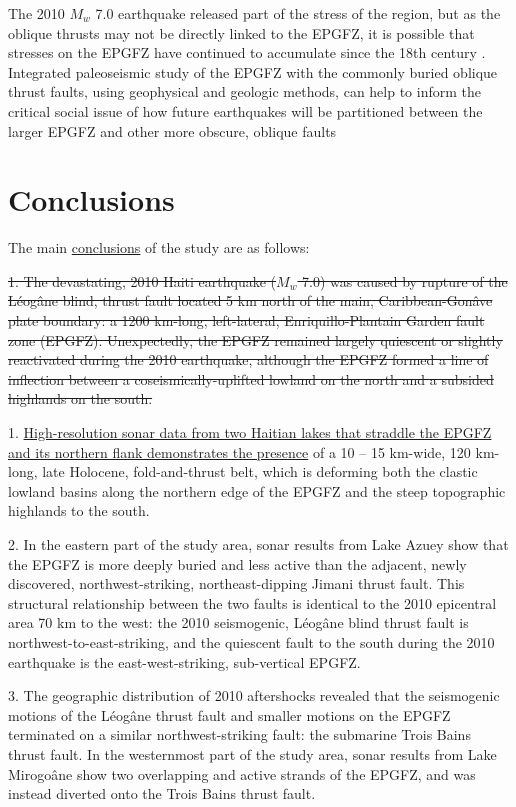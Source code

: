 \documentclass[linenumbers,draft]{agujournal}
\begin{document}
The 2010 $M_w$ 7.0 earthquake released part of the stress of the region, but as the oblique thrusts may not be directly linked to the EPGFZ, it is possible that stresses on the EPGFZ have continued to accumulate since the 18th century \citep{prentice2010seismic}. Integrated paleoseismic study of the EPGFZ with the commonly buried oblique thrust faults, using geophysical and geologic methods, can help to inform the critical social issue of how future earthquakes will be partitioned between the larger EPGFZ and other more obscure, oblique faults

\section{Conclusions}
The main \ul{conclusions} of the study are as follows: 

\st{1. The devastating, 2010 Haiti earthquake ($M_w$ 7.0) was caused by rupture of the L\'eog\^ane blind, thrust fault located 5 km north of the main, Caribbean-Gon\^ave plate boundary: a 1200 km-long, left-lateral, Enriquillo-Plantain Garden fault zone (EPGFZ). Unexpectedly, the EPGFZ remained largely quiescent or slightly reactivated during the 2010 earthquake, although the EPGFZ formed a line of inflection between a coseismically-uplifted lowland on the north and a subsided highlands on the south.} 

1. \ul{High-resolution sonar data from two Haitian lakes that straddle the EPGFZ and its northern flank demonstrates the presence} of a 10 -- 15 km-wide, 120 km-long, late Holocene, fold-and-thrust belt, which is deforming both the clastic lowland basins along the northern edge of the EPGFZ and the steep topographic highlands to the south. 

2. In the eastern part of the study area, sonar results from Lake Azuey show that the EPGFZ is more deeply buried and less active than the adjacent, newly discovered, northwest-striking, northeast-dipping Jimani thrust fault. This structural relationship between the two faults is identical to the 2010 epicentral area 70 km to the west: the 2010 seismogenic, L\'eog\^ane blind thrust fault is northwest-to-east-striking, and the quiescent fault to the south during the 2010 earthquake is the east-west-striking, sub-vertical EPGFZ. 

3. The geographic distribution of 2010 aftershocks revealed that the seismogenic motions of the L\'eog\^ane thrust fault and smaller motions on the EPGFZ terminated on a similar northwest-striking fault: the submarine Trois Bains thrust fault. In the westernmost part of the study area, sonar results from Lake Mirogo\^ane show two overlapping and active strands of the EPGFZ, and was instead diverted onto the Trois Bains thrust fault.
\end{document}
